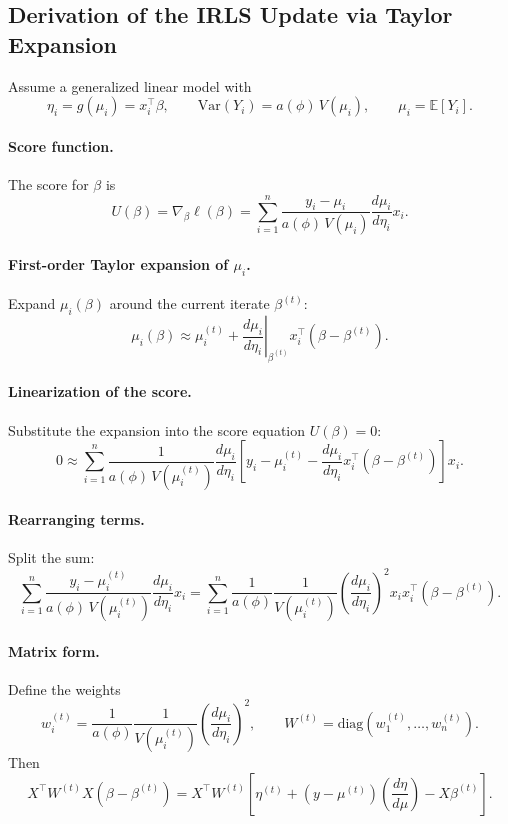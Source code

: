 \documentclass[11pt]{article}
\theoremstyle{definition}
\begin{document}
\subsection{Derivation of the IRLS Update via Taylor Expansion}

Assume a generalized linear model with
\[
\eta_i = g(\mu_i) = x_i^\top \beta,
\qquad
\mathrm{Var}(Y_i) = a(\phi)\,V(\mu_i),
\qquad
\mu_i = \mathbb{E}[Y_i].
\]

\paragraph{Score function.}
The score for $\beta$ is
\[
U(\beta)
=
\nabla_\beta \ell(\beta)
=
\sum_{i=1}^n
\frac{y_i - \mu_i}{a(\phi)\,V(\mu_i)}
\frac{d\mu_i}{d\eta_i}
x_i.
\]

\paragraph{First-order Taylor expansion of $\mu_i$.}
Expand $\mu_i(\beta)$ around the current iterate $\beta^{(t)}$:
\[
\mu_i(\beta)
\approx
\mu_i^{(t)}
+
\left.
\frac{d\mu_i}{d\eta_i}
\right|_{\beta^{(t)}}
x_i^\top (\beta - \beta^{(t)}).
\]

\paragraph{Linearization of the score.}
Substitute the expansion into the score equation $U(\beta)=0$:
\[
0
\approx
\sum_{i=1}^n
\frac{1}{a(\phi)\,V(\mu_i^{(t)})}
\frac{d\mu_i}{d\eta_i}
\left[
y_i
-
\mu_i^{(t)}
-
\frac{d\mu_i}{d\eta_i}
x_i^\top (\beta - \beta^{(t)})
\right]
x_i.
\]

\paragraph{Rearranging terms.}
Split the sum:
\[
\sum_{i=1}^n
\frac{y_i-\mu_i^{(t)}}{a(\phi)\,V(\mu_i^{(t)})}
\frac{d\mu_i}{d\eta_i}
x_i
=
\sum_{i=1}^n
\frac{1}{a(\phi)}
\frac{1}{V(\mu_i^{(t)})}
\left(\frac{d\mu_i}{d\eta_i}\right)^2
x_i x_i^\top
(\beta-\beta^{(t)}).
\]

\paragraph{Matrix form.}
Define the weights
\[
w_i^{(t)}
=
\frac{1}{a(\phi)}
\frac{1}{V(\mu_i^{(t)})}
\left(\frac{d\mu_i}{d\eta_i}\right)^2,
\qquad
W^{(t)} = \mathrm{diag}(w_1^{(t)},\dots,w_n^{(t)}).
\]
Then
\[
X^\top W^{(t)} X
(\beta-\beta^{(t)})
=
X^\top W^{(t)}
\left[
\eta^{(t)}
+
(y-\mu^{(t)})
\left(\frac{d\eta}{d\mu}\right)
-
X\beta^{(t)}
\right].
\]
\end{document}
